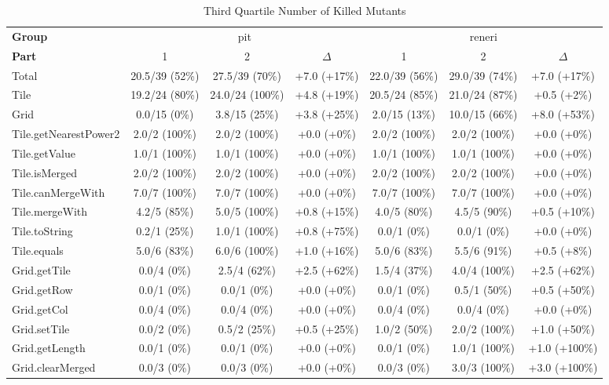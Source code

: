 \begin{sidewaystable}
\centering
\caption{Third Quartile Number of Killed Mutants}
\label{tab:third_quartile_number_of_killed_mutants}
\begin{tabular}{lcccccc}
\toprule
\textbf{Group} & \multicolumn{3}{c}{pit} & \multicolumn{3}{c}{reneri} \\
\textbf{Part} & 1 & 2 & $\Delta$ & 1 & 2 & $\Delta$ \\
\cmidrule(lr){1-1} \cmidrule(lr){2-4} \cmidrule(lr){5-7}
Total & 20.5/39 (52\%) & 27.5/39 (70\%) & +7.0 (+17\%) & 22.0/39 (56\%) & 29.0/39 (74\%) & +7.0 (+17\%) \\
\cmidrule(lr){1-1} \cmidrule(lr){2-4} \cmidrule(lr){5-7}
Tile & 19.2/24 (80\%) & 24.0/24 (100\%) & +4.8 (+19\%) & 20.5/24 (85\%) & 21.0/24 (87\%) & +0.5 (+2\%) \\
Grid & 0.0/15 (0\%) & 3.8/15 (25\%) & +3.8 (+25\%) & 2.0/15 (13\%) & 10.0/15 (66\%) & +8.0 (+53\%) \\
\cmidrule(lr){1-1} \cmidrule(lr){2-4} \cmidrule(lr){5-7}
Tile.getNearestPower2 & 2.0/2 (100\%) & 2.0/2 (100\%) & +0.0 (+0\%) & 2.0/2 (100\%) & 2.0/2 (100\%) & +0.0 (+0\%) \\
Tile.getValue & 1.0/1 (100\%) & 1.0/1 (100\%) & +0.0 (+0\%) & 1.0/1 (100\%) & 1.0/1 (100\%) & +0.0 (+0\%) \\
Tile.isMerged & 2.0/2 (100\%) & 2.0/2 (100\%) & +0.0 (+0\%) & 2.0/2 (100\%) & 2.0/2 (100\%) & +0.0 (+0\%) \\
Tile.canMergeWith & 7.0/7 (100\%) & 7.0/7 (100\%) & +0.0 (+0\%) & 7.0/7 (100\%) & 7.0/7 (100\%) & +0.0 (+0\%) \\
Tile.mergeWith & 4.2/5 (85\%) & 5.0/5 (100\%) & +0.8 (+15\%) & 4.0/5 (80\%) & 4.5/5 (90\%) & +0.5 (+10\%) \\
Tile.toString & 0.2/1 (25\%) & 1.0/1 (100\%) & +0.8 (+75\%) & 0.0/1 (0\%) & 0.0/1 (0\%) & +0.0 (+0\%) \\
Tile.equals & 5.0/6 (83\%) & 6.0/6 (100\%) & +1.0 (+16\%) & 5.0/6 (83\%) & 5.5/6 (91\%) & +0.5 (+8\%) \\
Grid.getTile & 0.0/4 (0\%) & 2.5/4 (62\%) & +2.5 (+62\%) & 1.5/4 (37\%) & 4.0/4 (100\%) & +2.5 (+62\%) \\
Grid.getRow & 0.0/1 (0\%) & 0.0/1 (0\%) & +0.0 (+0\%) & 0.0/1 (0\%) & 0.5/1 (50\%) & +0.5 (+50\%) \\
Grid.getCol & 0.0/4 (0\%) & 0.0/4 (0\%) & +0.0 (+0\%) & 0.0/4 (0\%) & 0.0/4 (0\%) & +0.0 (+0\%) \\
Grid.setTile & 0.0/2 (0\%) & 0.5/2 (25\%) & +0.5 (+25\%) & 1.0/2 (50\%) & 2.0/2 (100\%) & +1.0 (+50\%) \\
Grid.getLength & 0.0/1 (0\%) & 0.0/1 (0\%) & +0.0 (+0\%) & 0.0/1 (0\%) & 1.0/1 (100\%) & +1.0 (+100\%) \\
Grid.clearMerged & 0.0/3 (0\%) & 0.0/3 (0\%) & +0.0 (+0\%) & 0.0/3 (0\%) & 3.0/3 (100\%) & +3.0 (+100\%) \\
\bottomrule
\end{tabular}
\end{sidewaystable}
